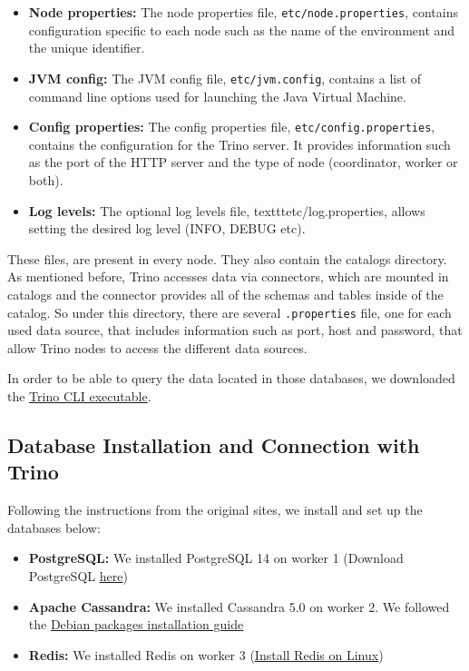 \documentclass[conference]{IEEEtran}
\begin{document}
\begin{itemize}
    \item \textbf{Node properties:} The node properties file, \texttt{etc/node.properties}, contains configuration specific to each node such as the name of the environment and the unique identifier.
    \item \textbf{JVM config:} The JVM config file, \texttt{etc/jvm.config}, contains a list of command line options used for launching the Java Virtual Machine. 
    \item \textbf{Config properties:} The config properties file, \texttt{etc/config.properties}, contains the configuration for the Trino server. It provides information such as the port of the HTTP server and the type of node (coordinator, worker or both). 
    \item \textbf{Log levels:} The optional log levels file, texttt{etc/log.properties}, allows setting the desired log level (INFO, DEBUG etc).
\end{itemize}

These files, are present in every node. They also contain the catalogs directory. As mentioned before, Trino accesses data via connectors, which are mounted in catalogs and the connector provides all 
of the schemas and tables inside of the catalog. So under this directory, there are several \texttt{.properties} file, one for each used data source, that includes information such as port, host and password, 
that allow Trino nodes to access the different data sources.

In order to be able to query the data located in those databases, we downloaded the \textcolor{linkblue}{\underline{\href{https://trino.io/docs/current/client/cli.html}{Trino CLI executable}}}.

\subsection{Database Installation and Connection with Trino}

Following the instructions from the original sites, we install and set up the databases below:

\begin{itemize}
    \item \textbf{PostgreSQL:} We installed PostgreSQL 14 on worker 1 (Download PostgreSQL \textcolor{linkblue}{\underline{\href{https://www.postgresql.org/download/}{here}}})
    \item \textbf{Apache Cassandra:} We installed Cassandra 5.0 on worker 2. We followed the \textcolor{linkblue}{\underline{\href{https://cassandra.apache.org/doc/stable/cassandra/getting_started/installing.html}{Debian packages installation guide}}}
    \item \textbf{Redis:} We installed Redis on worker 3 (\textcolor{linkblue}{\underline{\href{https://redis.io/docs/install/install-redis/install-redis-on-linux/}{Install Redis on Linux}}})
\end{itemize}
\end{document}
